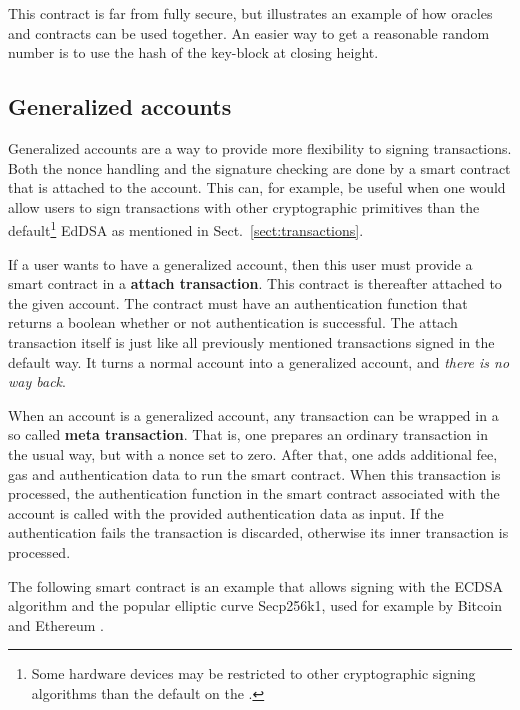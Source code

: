 This contract is far from fully secure, but illustrates an example of
how oracles and contracts can be used together. An easier way to
get a reasonable random number is to use the hash of the key-block at
closing height.




\subsection{Generalized accounts}
\label{sect:ga}

Generalized accounts are a way to provide more flexibility to signing
transactions. Both the nonce handling and the signature checking are
done by a smart contract that is attached to the account. This can,
for example, be useful when one would allow users to sign transactions with
other cryptographic primitives than the default\footnote{Some hardware
  devices may be restricted to other cryptographic signing algorithms
  than the default on the \blockchain.} EdDSA as mentioned in
Sect.\ \ref{sect:transactions}.

If a user wants to have a generalized account, then this user must
provide a smart contract in a \textbf{attach transaction}. This
contract is thereafter attached to the given account. The contract
must have an authentication function that returns a boolean whether or
not authentication is successful. The attach transaction itself is
just like all previously mentioned transactions signed in the default
way. It turns a normal account into a generalized account, and
\textit{there is no way back}.

When an account is a generalized account, any transaction can
be wrapped in a so called \textbf{meta transaction}. That is, one
prepares an ordinary transaction in the usual way, but with a nonce set to
zero. After that, one adds additional fee, gas and authentication data to
run the smart contract. When this transaction is processed, the
authentication function in the smart contract associated with the
account is called with the provided authentication data as input. If
the authentication fails the transaction is discarded, otherwise its
inner transaction is processed.

The following smart contract is an example that allows signing with
the ECDSA algorithm \cite{johnson2001elliptic} and the popular elliptic curve
Secp256k1, used for example by Bitcoin and Ethereum
\cite{bos2014elliptic, mayer2016ecdsa}.

